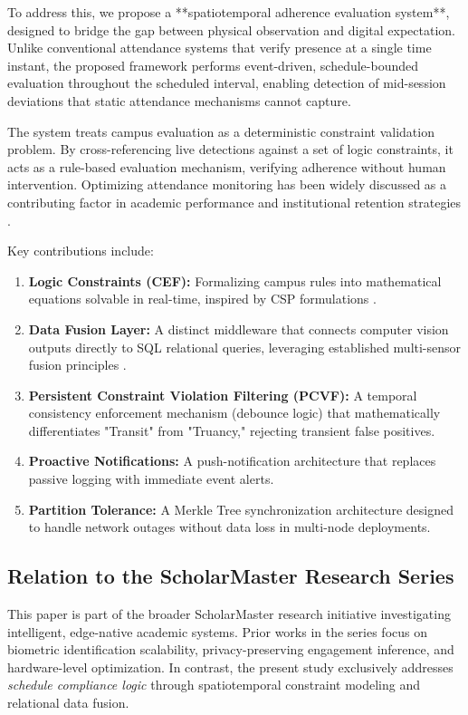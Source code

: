 \documentclass[conference]{IEEEtran}
\begin{document}
To address this, we propose a **spatiotemporal adherence evaluation system**, designed to bridge the gap between physical observation and digital expectation. Unlike conventional attendance systems that verify presence at a single time instant, the proposed framework performs event-driven, schedule-bounded evaluation throughout the scheduled interval, enabling detection of mid-session deviations that static attendance mechanisms cannot capture.

The system treats campus evaluation as a deterministic constraint validation problem. By cross-referencing live detections against a set of logic constraints, it acts as a rule-based evaluation mechanism, verifying adherence without human intervention. Optimizing attendance monitoring has been widely discussed as a contributing factor in academic performance and institutional retention strategies \cite{b22}.

Key contributions include:
\begin{enumerate}
    \item \textbf{Logic Constraints (CEF):} Formalizing campus rules into mathematical equations solvable in real-time, inspired by CSP formulations \cite{b24}.
    \item \textbf{Data Fusion Layer:} A distinct middleware that connects computer vision outputs directly to SQL relational queries, leveraging established multi-sensor fusion principles \cite{b21}.
    \item \textbf{Persistent Constraint Violation Filtering (PCVF):} A temporal consistency enforcement mechanism (debounce logic) that mathematically differentiates "Transit" from "Truancy," rejecting transient false positives.
    \item \textbf{Proactive Notifications:} A push-notification architecture that replaces passive logging with immediate event alerts.
    \item \textbf{Partition Tolerance:} A Merkle Tree synchronization architecture designed to handle network outages without data loss in multi-node deployments.
\end{enumerate}

\subsection{Relation to the ScholarMaster Research Series}
This paper is part of the broader ScholarMaster research initiative investigating intelligent, edge-native academic systems. Prior works in the series focus on biometric identification scalability, privacy-preserving engagement inference, and hardware-level optimization. In contrast, the present study exclusively addresses \textit{schedule compliance logic} through spatiotemporal constraint modeling and relational data fusion. 
\end{document}
